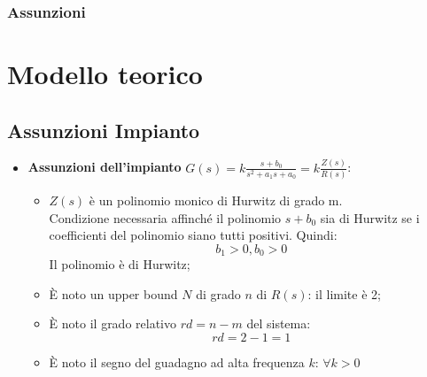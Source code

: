 \documentclass{beamer}
\begin{document}
\begin{frame}
	\frametitle{Assunzioni}%
	\section{Modello teorico}
	\subsection{Assunzioni Impianto}
    \begin{itemize}
        \item \textbf{Assunzioni dell'impianto} \(G(s)=k\frac{s+b_{0}}{s^{2}+a_{1}s+a_{0}}=k\frac{Z(s)}{R(s)}\):
        \begin{itemize}
            \item \(Z(s)\) è un polinomio monico di Hurwitz di grado m.\\
            Condizione necessaria affinché il polinomio \(s+b_{0}\) sia di Hurwitz se i coefficienti del polinomio siano tutti positivi. Quindi:\begin{equation}
                b_{1}>0, b_{0}>0
            \end{equation}
            Il polinomio è di Hurwitz;
            \item È noto un upper bound \(N\) di grado \(n\) di \(R(s)\): il limite è 2;
            \item È noto il grado relativo \(rd=n-m\) del sistema:\begin{equation}
                rd = 2- 1=1
            \end{equation}
            \item È noto il segno del guadagno ad alta frequenza \(k\): \(\forall k>0\)
        \end{itemize}
    \end{itemize}
\end{frame}
\end{document}
